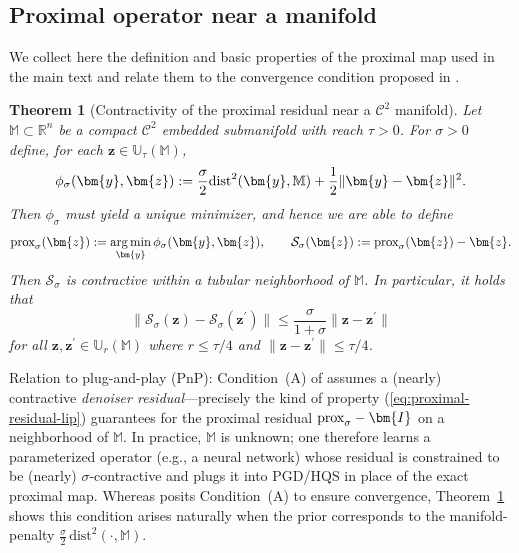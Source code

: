 \documentclass{amsart} %
\def\eqref#1{equation~\ref{#1}}
\def\vy{{\bm{y}}}
\def\vz{{\bm{z}}}
\def\mI{{\bm{I}}}
\def\sM{{\mathbb{M}}}
\def\sR{{\mathbb{R}}}
\def\sU{{\mathbb{U}}}
\DeclareMathOperator*{\argmin}{arg\,min}
\def\cC{{\mathcal{C}}}
\def\cS{{\mathcal{S}}}
\newcommand{\Urt}{\sU_r(\sM)}
\newcommand{\Utt}{\sU_\tau(\sM)}
\newtheorem{theorem}{Theorem}[section]
\theoremstyle{definition}
\theoremstyle{remark}
\renewcommand{\eqref}[1]{\textup{(\ref{#1})}}
\begin{document}
\subsection{Proximal operator near a manifold}
\label{sec:app-prox}
We collect here the definition and basic properties of the proximal map used in the main text and relate them to the convergence condition proposed in \cite{ryu2019plug}.


\begin{theorem}[Contractivity of the proximal residual near a $\cC^2$ manifold]
\label{thm:prox-residual}
Let $\sM\subset\sR^n$ be a compact $\cC^2$ embedded submanifold with reach $\tau>0$.
For $\sigma>0$ define, for each $\vz\in\Utt$,
\[
\phi_\sigma(\vy,\vz):= \frac{\sigma}{2} \textup{dist}^2(\vy,\sM) + \frac{1}{2}\|\vy - \vz \|^2.
\]
Then $\phi_\sigma$ must yield a unique minimizer, and hence we are able to define
\[
\textup{prox}_{\sigma}(\vz):=\argmin_{\vy} \phi_\sigma(\vy,\vz),
\qquad
\cS_\sigma(\vz):=\textup{prox}_\sigma(\vz)-\vz.
\]
Then $\cS_\sigma$ is contractive within a tubular neighborhood of $\sM$. In particular, it holds that
\begin{equation}
\label{eq:proximal-residual-lip}
\|\cS_\sigma(\vz)-\cS_\sigma(\vz^\prime)\| \leq \frac{\sigma}{1+\sigma} \|\vz - \vz^\prime\|
\end{equation}
for all $\vz,\vz^\prime \in \Urt$ where $r \leq \tau/4$ and $\|\vz - \vz^\prime\|\leq\tau/4$.
\end{theorem}

Relation to plug-and-play (PnP):
Condition~(A) of \cite{ryu2019plug} assumes a (nearly) contractive \emph{denoiser residual}—precisely the kind of property \eqref{eq:proximal-residual-lip} guarantees for the proximal residual $\textup{prox}_{\sigma}-\mI$ on a neighborhood of $\sM$.
In practice, $\sM$ is unknown; one therefore learns a parameterized operator (e.g., a neural network) whose residual is constrained to be (nearly) $\sigma$-contractive and plugs it into PGD/HQS in place of the exact proximal map.
Whereas \cite{ryu2019plug} posits Condition~(A) to ensure convergence, Theorem~\ref{thm:prox-residual} shows this condition arises naturally when the prior corresponds to the manifold-penalty $\tfrac{\sigma}{2}\,\mathrm{dist}^2(\cdot,\sM)$.
\end{document}
